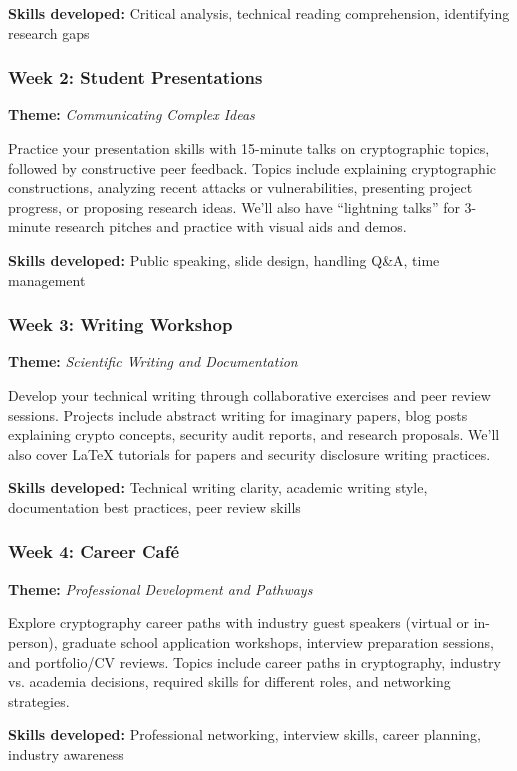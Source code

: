 \documentclass[10pt,a4paper,american]{exam}
\begin{document}
\textbf{Skills developed:} Critical analysis, technical reading comprehension, identifying research gaps

\subsubsection*{Week 2: Student Presentations}
\textbf{Theme:} \textit{Communicating Complex Ideas}

Practice your presentation skills with 15-minute talks on cryptographic topics, followed by constructive peer feedback. Topics include explaining cryptographic constructions, analyzing recent attacks or vulnerabilities, presenting project progress, or proposing research ideas. We'll also have ``lightning talks'' for 3-minute research pitches and practice with visual aids and demos.

\textbf{Skills developed:} Public speaking, slide design, handling Q\&A, time management

\subsubsection*{Week 3: Writing Workshop}
\textbf{Theme:} \textit{Scientific Writing and Documentation}

Develop your technical writing through collaborative exercises and peer review sessions. Projects include abstract writing for imaginary papers, blog posts explaining crypto concepts, security audit reports, and research proposals. We'll also cover LaTeX tutorials for papers and security disclosure writing practices.

\textbf{Skills developed:} Technical writing clarity, academic writing style, documentation best practices, peer review skills

\subsubsection*{Week 4: Career Café}
\textbf{Theme:} \textit{Professional Development and Pathways}

Explore cryptography career paths with industry guest speakers (virtual or in-person), graduate school application workshops, interview preparation sessions, and portfolio/CV reviews. Topics include career paths in cryptography, industry vs. academia decisions, required skills for different roles, and networking strategies.

\textbf{Skills developed:} Professional networking, interview skills, career planning, industry awareness
\end{document}
